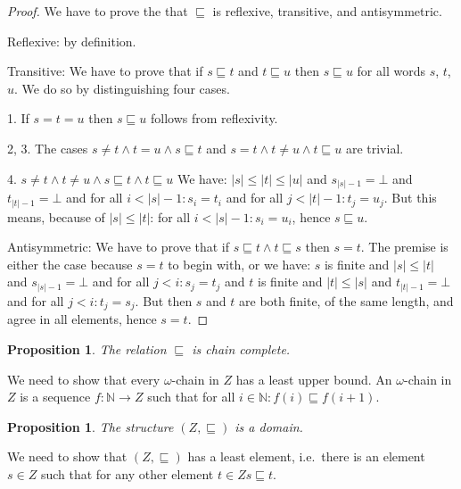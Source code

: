 \documentclass[a4paper]{article}
\newcommand{\arr}{\rightarrow}
\newtheorem{thmPONuFisChainComplete}[defNuF]{Proposition}
\newtheorem{thmPONuFisADomain}[defNuF]{Proposition}
\begin{document}
\begin{proof}

We have to prove the that $\sqsubseteq$ is reflexive, transitive, and
antisymmetric.

Reflexive: by definition.

Transitive: We have to prove that if $s \sqsubseteq t$ and $t \sqsubseteq u$
then $s \sqsubseteq u$ for all words $s$, $t$, $u$. We do so by distinguishing
four cases.

1. If $s = t = u$ then $s \sqsubseteq u$ follows from reflexivity.

2, 3. The cases $s \neq t \wedge t = u \wedge s \sqsubseteq t$ and $s = t
\wedge t \neq u \wedge t \sqsubseteq u$ are trivial.

4. $s \neq t \wedge t \neq u \wedge s \sqsubseteq t \wedge t \sqsubseteq u$ We
have: $|s| \leq |t| \leq |u|$ and $s_{|s|-1} = \bot$ and $t_{|t|-1} = \bot$ and
for all $i < |s|-1: s_i = t_i$ and for all $j < |t|-1: t_j = u_j$.  But this
means, because of $|s| \leq |t|$: for all $i < |s|-1: s_i = u_i$, hence $s
\sqsubseteq u$.

Antisymmetric: We have to prove that if $s \sqsubseteq t \wedge t \sqsubseteq
s$ then $s = t$.  The premise is either the case because $s = t$ to begin with,
or we have: $s$ is finite and $|s| \leq |t|$ and $s_{|s|-1} = \bot$ and for all $j <
i: s_j = t_j$ and $t$ is finite and $|t| \leq |s|$ and $t_{|t|-1} = \bot$ and for all
$j < i: t_j = s_j$.  But then $s$ and $t$ are both finite, of the same length,
and agree in all elements, hence $s = t$.

\end{proof}

\begin{thmPONuFisChainComplete}

The relation $\sqsubseteq$ is chain complete.

\end{thmPONuFisChainComplete}

We need to show that every $\omega$-chain in $Z$ has a least upper bound.
An $\omega$-chain in $Z$ is a sequence $f : \mathbb{N} \arr Z$ such
that for all $i \in \mathbb{N}: f(i) \sqsubseteq f(i + 1)$.


\begin{thmPONuFisADomain}

The structure $(Z, \sqsubseteq)$ is a domain.

\end{thmPONuFisADomain}

We need to show that $(Z, \sqsubseteq)$ has a least element, i.e.~there is
an element $s \in Z$ such that for any other element $t \in Z s
\sqsubseteq t$.
\end{document}
